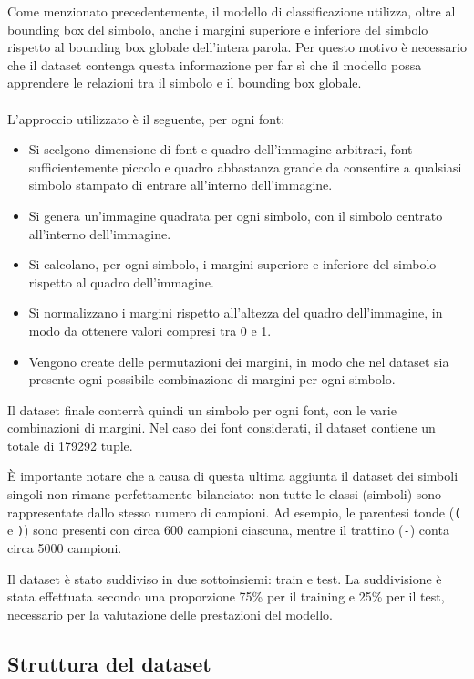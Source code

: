 Come menzionato precedentemente, il modello di classificazione utilizza, oltre al bounding box del simbolo, anche i margini superiore e inferiore del simbolo rispetto al bounding box globale dell'intera parola. Per questo motivo è necessario che il dataset contenga questa informazione per far sì che il modello possa apprendere le relazioni tra il simbolo e il bounding box globale.
\\ \\
L'approccio utilizzato è il seguente, per ogni font:
\begin{itemize}
	\item Si scelgono dimensione di font e quadro dell'immagine arbitrari, font sufficientemente piccolo e quadro abbastanza grande da consentire a qualsiasi simbolo stampato di entrare all'interno dell'immagine.
	\item Si genera un'immagine quadrata per ogni simbolo, con il simbolo centrato all'interno dell'immagine.
	\item Si calcolano, per ogni simbolo, i margini superiore e inferiore del simbolo rispetto al quadro dell'immagine.
	\item Si normalizzano i margini rispetto all'altezza del quadro dell'immagine, in modo da ottenere valori compresi tra 0 e 1.
	\item Vengono create delle permutazioni dei margini, in modo che nel dataset sia presente ogni possibile combinazione di margini per ogni simbolo.
\end{itemize}

Il dataset finale conterrà quindi un simbolo per ogni font, con le varie combinazioni di margini.  Nel caso dei font considerati, il dataset contiene un totale di 179292 tuple.

È importante notare che a causa di questa ultima aggiunta il dataset dei simboli singoli non rimane perfettamente bilanciato: non tutte le classi (simboli) sono rappresentate dallo stesso numero di campioni. Ad esempio, le parentesi tonde (\texttt{(} e \texttt{)}) sono presenti con circa 600 campioni ciascuna, mentre il trattino (\texttt{-}) conta circa 5000 campioni.

Il dataset è stato suddiviso in due sottoinsiemi: train e test. La suddivisione è stata effettuata secondo una proporzione 75\% per il training e 25\% per il test, necessario per la valutazione delle prestazioni del modello.

\subsection{Struttura del dataset}

